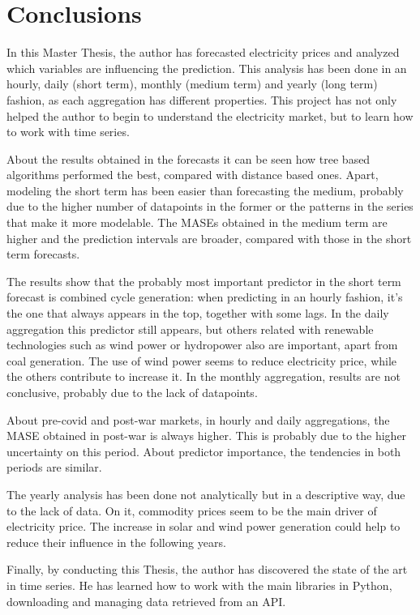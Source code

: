 \chapter{Conclusions}
In this Master Thesis, the author has forecasted electricity prices and analyzed which variables are influencing the prediction. This analysis has been done in an hourly, daily (short term), monthly (medium term) and yearly  (long term) fashion, as each aggregation has different properties. This project has not only helped the author to begin to understand the electricity market, but to learn how to work with time series.

About the results obtained in the forecasts it can be seen how tree based algorithms performed the best, compared with distance based ones. Apart, modeling the short term has been easier than forecasting the medium, probably due to the higher number of datapoints in the former or the patterns in the series that make it more modelable. The MASEs obtained in the medium term are higher and the prediction intervals are broader, compared with those in the short term forecasts.

The results show that the probably most important predictor in the short term forecast is combined cycle generation: when predicting in an hourly fashion, it's the one that always appears in the top, together with some lags. In the daily aggregation this predictor still appears, but others related with renewable technologies such as wind power or hydropower also are important, apart from coal generation. The use of wind power seems to reduce electricity price, while the others contribute to increase it. In the monthly aggregation, results are not conclusive, probably due to the lack of datapoints.

About pre-covid and post-war markets, in hourly and daily aggregations, the MASE obtained in post-war is always higher. This is probably due to the higher uncertainty on this period. About predictor importance, the tendencies in both periods are similar.

The yearly analysis has been done not analytically but in a descriptive way, due to the lack of data. On it, commodity prices seem to be the main driver of electricity price. The increase in solar and wind power generation could help to reduce their influence in the following years.

Finally, by conducting this Thesis, the author has discovered the state of the art in time series. He has learned how to work with the main libraries in Python, downloading and managing data retrieved from an API.